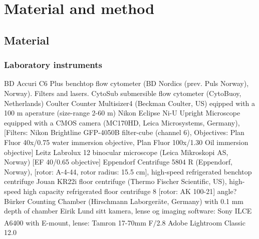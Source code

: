\chapter{Material and method}
\label{chap:m&m}

\section{Material}

\subsection{Laboratory instruments}
BD Accuri C6 Plus benchtop flow cytometer (BD Nordics (prev. Puls Norway), Norway). Filters and lasers.
CytoSub submersible flow cytometer (CytoBuoy, Netherlands)
Coulter Counter Multisizer4 (Beckman Coulter, US) eqipped with a 100 \micro m aperature (size-range 2-60 \micro m)
Nikon Eclipse Ni-U Upright Microscope equipped with a CMOS camera (MC170HD, Leica Microsystems, Germany), [Filters: Nikon Brightline GFP-4050B filter-cube (channel 6), Objectives: Plan Fluor 40x/0.75 water immersion objective, Plan Fluor 100x/1.30 Oil immersion objective]
Leitz Labrolux 12 binocular microscope (Leica Mikroskopi AS, Norway) [EF 40/0.65 objective]
Eppendorf Centrifuge 5804 R (Eppendorf, Norway), [rotor: A-4-44, rotor radius: 15.5 cm], high-speed refrigerated benchtop centrifuge
Jouan KR22i floor centrifuge (Thermo Fischer Scientific, US), high-speed high capacity refrigerated floor centrifuge 8 [rotor: AK 100-21] angle?
Bürker Counting Chamber (Hirschmann Laborgeräte, Germany) with 0.1 mm depth of chamber
Eirik Lund sitt kamera, lense og imaging software: 
Sony ILCE A6400 with E-mount, lense: Tamron 17-70mm F/2.8 
Adobe\textsuperscript{\textregistered} Lightroom Classic 12.0 

